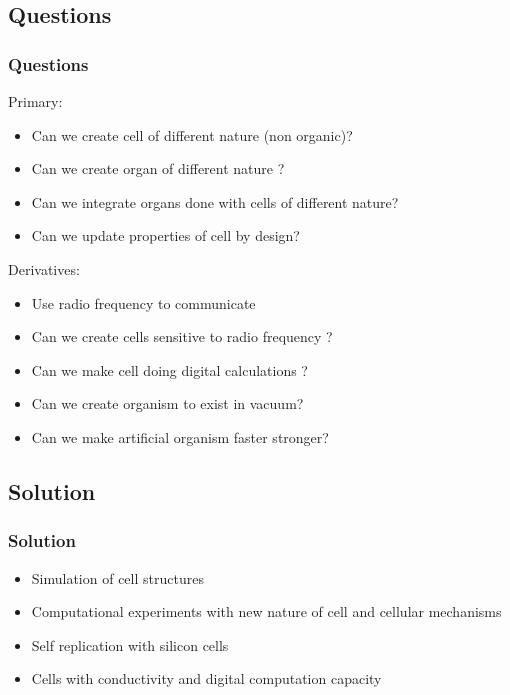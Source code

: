 \documentclass[12pt, aspectratio=169]{beamer}
\begin{document}
\subsection{Questions}
\begin{frame}
\frametitle{Questions}

Primary:
\begin{itemize}
\item Can we create cell of different nature (non organic)?
\item Can we create organ of different nature ?
\item Can we integrate organs done with cells of different nature?
\item Can we update properties of cell by design?
\end{itemize}

Derivatives:
\begin{itemize}
\item Use radio frequency to communicate
\item  Can we create cells sensitive to radio frequency ?
\item  Can we make cell doing digital calculations ?
\item  Can we create organism to exist in vacuum?
\item  Can we make artificial organism faster stronger?
\end{itemize}
\end{frame}

\subsection{Solution}
\begin{frame}
\frametitle{Solution}

\begin{itemize}
\item Simulation of cell structures
\item Computational experiments with new nature of cell and cellular mechanisms
\item Self replication with silicon cells
\item Cells with conductivity and digital computation capacity
\end{itemize}

\end{frame}
\end{document}

